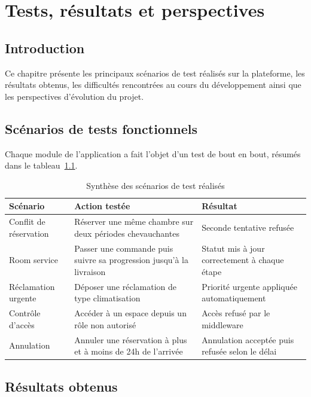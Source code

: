 \documentclass[12pt,a4paper]{report}
\begin{document}
\chapter{Tests, résultats et perspectives}

\section{Introduction}

Ce chapitre présente les principaux scénarios de test réalisés sur la
plateforme, les résultats obtenus, les difficultés rencontrées au cours du
développement ainsi que les perspectives d'évolution du projet.

\section{Scénarios de tests fonctionnels}

Chaque module de l'application a fait l'objet d'un test de bout en bout,
résumés dans le tableau~\ref{tab:tests}.

\begin{table}[H]
\centering
\begin{tabular}{p{4cm} p{5cm} p{4cm}}
\toprule
\textbf{Scénario} & \textbf{Action testée} & \textbf{Résultat} \\
\midrule
Conflit de réservation & Réserver une même chambre sur deux périodes
chevauchantes & Seconde tentative refusée \\
Room service & Passer une commande puis suivre sa progression jusqu'à la
livraison & Statut mis à jour correctement à chaque étape \\
Réclamation urgente & Déposer une réclamation de type climatisation &
Priorité urgente appliquée automatiquement \\
Contrôle d'accès & Accéder à un espace depuis un rôle non autorisé &
Accès refusé par le middleware \\
Annulation & Annuler une réservation à plus et à moins de 24h de
l'arrivée & Annulation acceptée puis refusée selon le délai \\
\bottomrule
\end{tabular}
\caption{Synthèse des scénarios de test réalisés}
\label{tab:tests}
\end{table}

\section{Résultats obtenus}
\end{document}
